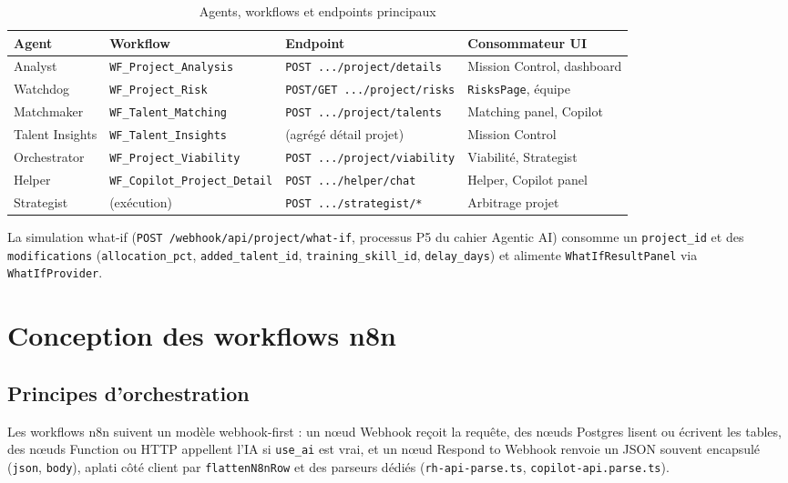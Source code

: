 \begin{table}[htbp]
\centering
\caption{Agents, workflows et endpoints principaux}
\label{tab:agents-ch4}
\begin{tabular}{@{}p{2.4cm}p{2.6cm}p{4.2cm}p{3.8cm}@{}}
\toprule
\textbf{Agent} & \textbf{Workflow} & \textbf{Endpoint} & \textbf{Consommateur UI} \\
\midrule
Analyst & \texttt{WF\_Project\_Analysis} & \texttt{POST .../project/details} & Mission Control, dashboard \\
Watchdog & \texttt{WF\_Project\_Risk} & \texttt{POST/GET .../project/risks} & \texttt{RisksPage}, équipe \\
Matchmaker & \texttt{WF\_Talent\_Matching} & \texttt{POST .../project/talents} & Matching panel, Copilot \\
Talent Insights & \texttt{WF\_Talent\_Insights} & (agrégé détail projet) & Mission Control \\
Orchestrator & \texttt{WF\_Project\_Viability} & \texttt{POST .../project/viability} & Viabilité, Strategist \\
Helper & \texttt{WF\_Copilot\_Project\_Detail} & \texttt{POST .../helper/chat} & Helper, Copilot panel \\
Strategist & (exécution) & \texttt{POST .../strategist/*} & Arbitrage projet \\
\bottomrule
\end{tabular}
\end{table}

La simulation what-if (\texttt{POST /webhook/api/project/what-if}, processus P5 du cahier Agentic AI) consomme un \texttt{project\_id} et des \texttt{modifications} (\texttt{allocation\_pct}, \texttt{added\_talent\_id}, \texttt{training\_skill\_id}, \texttt{delay\_days}) et alimente \texttt{WhatIfResultPanel} via \texttt{WhatIfProvider}.

\section{Conception des workflows n8n}

\subsection{Principes d'orchestration}

Les workflows n8n suivent un modèle webhook-first : un nœud Webhook reçoit la requête, des nœuds Postgres lisent ou écrivent les tables, des nœuds Function ou HTTP appellent l'IA si \texttt{use\_ai} est vrai, et un nœud Respond to Webhook renvoie un JSON souvent encapsulé (\texttt{json}, \texttt{body}), aplati côté client par \texttt{flattenN8nRow} et des parseurs dédiés (\texttt{rh-api-parse.ts}, \texttt{copilot-api.parse.ts}).

